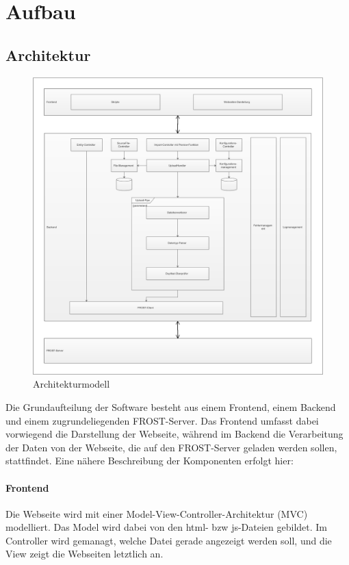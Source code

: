 \section{Aufbau}

\subsection{Architektur}
\begin{figure}[htbp]
\centering
\includegraphics[scale=0.44]{uml/architektur.eps}
\caption{\label{fig:architektur} Architekturmodell}
\end{figure}

Die Grundaufteilung der Software besteht aus einem Frontend, einem Backend und einem zugrundeliegenden FROST-Server. Das Frontend umfasst dabei vorwiegend die Darstellung der Webseite, während im Backend die Verarbeitung der Daten von der Webseite, die auf den FROST-Server geladen werden sollen, stattfindet. Eine nähere Beschreibung der Komponenten erfolgt hier:

\paragraph{Frontend}
Die Webseite wird mit einer Model-View-Controller-Architektur (MVC) modelliert.
Das Model wird dabei von den html- bzw js-Dateien gebildet.
Im Controller wird gemanagt, welche Datei gerade angezeigt werden soll, und die View zeigt die Webseiten letztlich an.

